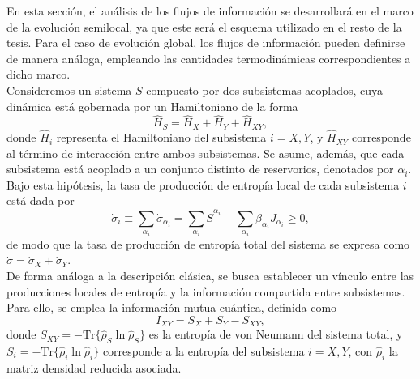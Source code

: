 En esta sección, el análisis de los flujos de información se desarrollará en el marco de la evolución semilocal, ya que este será el esquema utilizado en el resto de la tesis. Para el caso de evolución global, los flujos de información pueden definirse de manera análoga, empleando las cantidades termodinámicas correspondientes a dicho marco.
\\

Consideremos un sistema $S$ compuesto por dos subsistemas acoplados, cuya dinámica está gobernada por un Hamiltoniano de la forma
\[
    \hat{H}_{S} = \hat{H}_{X} + \hat{H}_{Y} + \hat{H}_{XY}, 
\]
donde $\hat{H}_{i}$ representa el Hamiltoniano del subsistema $i = X,Y$, y $\hat{H}_{XY}$ corresponde al término de interacción entre ambos subsistemas. Se asume, además, que cada subsistema está acoplado a un conjunto distinto de reservorios, denotados por $\alpha_{i}$. Bajo esta hipótesis, la tasa de producción de entropía local de cada subsistema $i$ está dada por
\[
    \dot{\sigma}_{i} \equiv \sum_{\alpha_{i}} \dot{\sigma}_{\alpha_{i}} = \sum_{\alpha_{i}} \dot{S}^{\alpha_{i}} - \sum_{\alpha_{i}} \beta_{\alpha_{i}} J_{\alpha_{i}} \geq 0,
\]
de modo que la tasa de producción de entropía total del sistema se expresa como $\dot{\sigma} = \dot{\sigma}_{X} + \dot{\sigma}_{Y}$.
\\

De forma análoga a la descripción clásica, se busca establecer un vínculo entre las producciones locales de entropía y la información compartida entre subsistemas. Para ello, se emplea la información mutua cuántica, definida como
\[
    I_{XY} = S_{X} + S_{Y} - S_{XY},
\]
donde $S_{XY} = -\mathrm{Tr}\{ \hat{\rho}_{S} \ln \hat{\rho}_{S} \}$ es la entropía de von Neumann del sistema total, y $S_{i} = - \mathrm{Tr}\{ \hat{\rho}_{i} \ln \hat{\rho}_{i} \}$ corresponde a la entropía del subsistema $i = X, Y$, con $\hat{\rho}_{i}$ la matriz densidad reducida asociada.
\\

